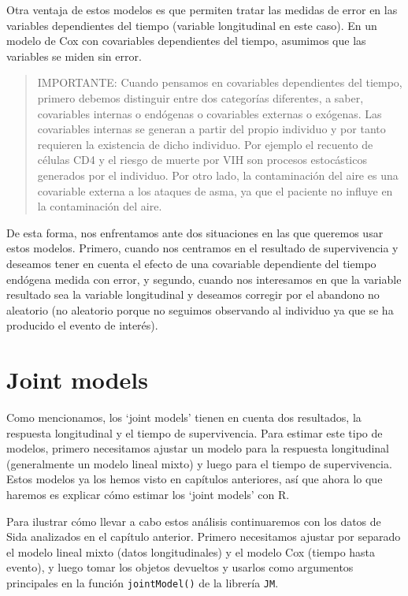 \documentclass[
]{book}
\begin{document}
Otra ventaja de estos modelos es que permiten tratar las medidas de error en las variables dependientes del tiempo (variable longitudinal en este caso). En un modelo de Cox con covariables dependientes del tiempo, asumimos que las variables se miden sin error.

\begin{quote}
IMPORTANTE: Cuando pensamos en covariables dependientes del tiempo, primero debemos distinguir entre dos categorías diferentes, a saber, covariables internas o endógenas o covariables externas o exógenas. Las covariables internas se generan a partir del propio individuo y por tanto requieren la existencia de dicho individuo. Por ejemplo el recuento de células CD4 y el riesgo de muerte por VIH son procesos estocásticos generados por el individuo. Por otro lado, la contaminación del aire es una covariable externa a los ataques de asma, ya que el paciente no influye en la contaminación del aire.
\end{quote}

De esta forma, nos enfrentamos ante dos situaciones en las que queremos usar estos modelos. Primero, cuando nos centramos en el resultado de supervivencia y deseamos tener en cuenta el efecto de una covariable dependiente del tiempo endógena medida con error, y segundo, cuando nos interesamos en que la variable resultado sea la variable longitudinal y deseamos corregir por el abandono no aleatorio (no aleatorio porque no seguimos observando al individuo ya que se ha producido el evento de interés).

\hypertarget{joint-models}{%
\section{Joint models}\label{joint-models}}

Como mencionamos, los `joint models' tienen en cuenta dos resultados, la respuesta longitudinal y el tiempo de supervivencia. Para estimar este tipo de modelos, primero necesitamos ajustar un modelo para la respuesta longitudinal (generalmente un modelo lineal mixto) y luego para el tiempo de supervivencia. Estos modelos ya los hemos visto en capítulos anteriores, así que ahora lo que haremos es explicar cómo estimar los `joint models' con R.

Para ilustrar cómo llevar a cabo estos análisis continuaremos con los datos de Sida analizados en el capítulo anterior. Primero necesitamos ajustar por separado el modelo lineal mixto (datos longitudinales) y el modelo Cox (tiempo hasta evento), y luego tomar los objetos devueltos y usarlos como argumentos principales en la función \texttt{jointModel()} de la librería \texttt{JM}.
\end{document}
